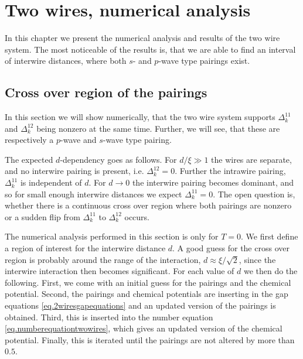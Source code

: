 
\chapter{Two wires, numerical analysis} %

\label{Chapter10} %


In this chapter we present the numerical analysis and results of the two wire system. The most noticeable of the results is, that we are able to find an interval of interwire distances, where both $s$- and $p$-wave type pairings exist. 

\section{Cross over region of the pairings}
In this section we will show numerically, that the two wire system supports $\Delta^{11}_k$ and $\Delta^{12}_k$ being nonzero at the same time. Further, we will see, that these are respectively a $p$-wave and $s$-wave type pairing. 

The expected $d$-dependency goes as follows. For $d/\xi \gg 1$ the wires are separate, and no interwire pairing is present, i.e. $\Delta^{12}_k = 0$. Further the intrawire pairing, $\Delta^{11}_k$ is independent of $d$. For $d\to 0$ the interwire pairing becomes dominant, and so for small enough interwire distances we expect $\Delta^{11}_k = 0$. The open question is, whether there is a continuous cross over region where both pairings are nonzero or a sudden flip from $\Delta^{11}_k$ to $\Delta^{12}_k$ occurs. 

The numerical analysis performed in this section is only for $T = 0$. We first define a region of interest for the interwire distance $d$. A good guess for the cross over region is probably around the range of the interaction, $d \approx \xi/\sqrt{2}$, since the interwire interaction then becomes significant. For each value of $d$ we then do the following. First, we come with an initial guess for the pairings and the chemical potential. Second, the pairings and chemical potentials are inserting in the gap equations \ref{eq.2wiresgapequations} and an updated version of the pairings is obtained. Third, this is inserted into the number equation \ref{eq.numberequationtwowires}, which gives an updated version of the chemical potential. Finally, this is iterated until the pairings are not altered by more than $0.5$\textperthousand. 


